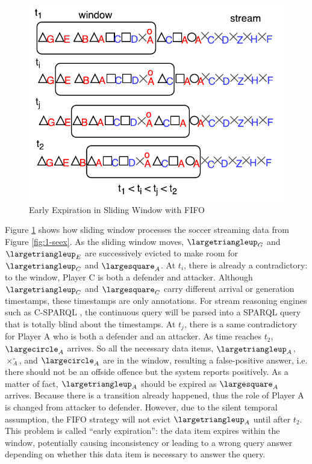 \begin{figure}[!htbp]
	\centering
	\includegraphics[width=5in]{img/1-seexw.pdf}
	\caption{Early Expiration in Sliding Window with FIFO}
	\label{fig:1-seexw} 
\end{figure}

Figure \ref{fig:1-seexw} shows how sliding window processes the soccer streaming data from Figure \ref{fig:1-seex}. 
As the sliding window moves, $\largetriangleup_{G}$ and $\largetriangleup_{E}$ are successively evicted to make room for $\largetriangleup_{C}$ and $\largesquare_{A}$.
At $t_{i}$, there is already a contradictory: to the window, Player C is both a defender and attacker. 
Although $\largetriangleup_{C}$ and $\largesquare_{C}$ carry different arrival or generation timestamps, these timestamps are only annotations.
For stream reasoning engines such as C-SPARQL \cite{barbieri2010execution}, the continuous query will be parsed into a SPARQL query that is totally blind about the timestamps. 
At $t_{j}$, there is a same contradictory for Player A who is both a defender and an attacker. 
As time reaches $t_{2}$, $\largecircle_{A}$ arrives. 
So all the necessary data items, $\largetriangleup_{A}$, $\times^{\circ}_{A}$, and $\largecircle_{A}$ are in the window, resulting a false-positive answer, i.e. there should not be an offside offence but the system reports positively. 
As a matter of fact, $\largetriangleup_{A}$ should be expired as $\largesquare_{A}$ arrives.
Because there is a transition already happened, thus the role of Player A is changed from attacker to defender. 
However, due to the silent temporal assumption, the FIFO strategy will not evict $\largetriangleup_{A}$ until after $t_{2}$.
This problem is called ``early expiration'': the data item expires within the window, potentially causing inconsistency or leading to a wrong query answer depending on whether this data item is necessary to answer the query. 
%
